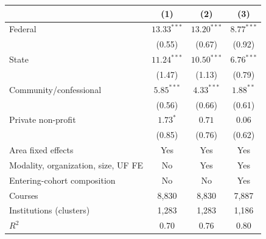 \begin{tabular}{lccc}
\toprule
 & (1) & (2) & (3) \\
\midrule
Federal & $13.33^{***}$ & $13.20^{***}$ & $8.77^{***}$ \\
 & (0.55) & (0.67) & (0.92) \\
State & $11.24^{***}$ & $10.50^{***}$ & $6.76^{***}$ \\
 & (1.47) & (1.13) & (0.79) \\
Community/confessional & $5.85^{***}$ & $4.33^{***}$ & $1.88^{**}$ \\
 & (0.56) & (0.66) & (0.61) \\
Private non-profit & $1.73^{*}$ & $0.71$ & $0.06$ \\
 & (0.85) & (0.76) & (0.62) \\
\midrule
Area fixed effects & Yes & Yes & Yes \\
Modality, organization, size, UF FE & No & Yes & Yes \\
Entering-cohort composition & No & No & Yes \\
Courses & 8{,}830 & 8{,}830 & 7{,}887 \\
Institutions (clusters) & 1{,}283 & 1{,}283 & 1{,}186 \\
$R^2$ & 0.70 & 0.76 & 0.80 \\
\bottomrule
\end{tabular}